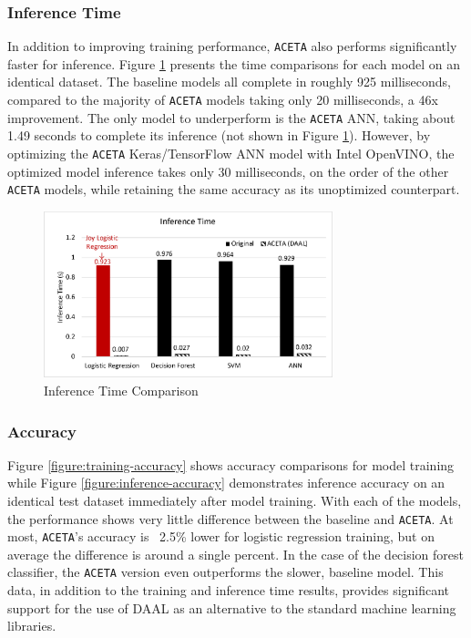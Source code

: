 \subsubsection{Inference Time}
In addition to improving training performance, \texttt{ACETA} also performs significantly faster for inference. Figure \ref{figure:inference-time} presents the time comparisons for each model on an identical dataset. The baseline models all complete in roughly 925 milliseconds, compared to the majority of \texttt{ACETA} models taking only 20 milliseconds, a 46x improvement. The only model to underperform is the \texttt{ACETA} ANN, taking about 1.49 seconds to complete its inference (not shown in Figure \ref{figure:inference-time}). However, by optimizing the \texttt{ACETA} Keras/TensorFlow ANN model with Intel OpenVINO, the optimized model inference takes only 30 milliseconds, on the order of the other \texttt{ACETA} models, while retaining the same accuracy as its unoptimized counterpart. 

\begin{figure}[h!]
	\centering
	\includegraphics[width=3.3in]{./fig/inference-time.eps}
	\caption{Inference Time Comparison}
	\label{figure:inference-time}
\end{figure}

\subsubsection{Accuracy}
Figure \ref{figure:training-accuracy} shows accuracy comparisons for model training while Figure  \ref{figure:inference-accuracy} demonstrates inference accuracy on an identical test dataset immediately after model training. With each of the models, the performance shows very little difference between the baseline and \texttt{ACETA}. At most, \texttt{ACETA}'s accuracy is ~2.5\% lower for logistic regression training, but on average the difference is around a single percent. In the case of the decision forest classifier, the \texttt{ACETA} version even outperforms the slower, baseline model. This data, in addition to the training and inference time results, provides significant support for the use of DAAL as an alternative to the standard machine learning libraries.

